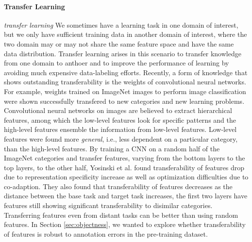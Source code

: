 \paragraph{Transfer Learning}
\textit{transfer learning}
We sometimes have a learning task in one domain of interest, but we only have sufficient training data in another domain of interest, where the two domain may or may not share the same feature space and have the same data distribution.
Transfer learning arises in this scenario to transfer knowledge from one domain to anthoer and to improve the performance of learning by avoiding much expensive data-labeling efforts.\cite{pan2010survey}
Recently, a form of knowledge that shows outstanding transferability is the weights of convolutional neural networks.
For example, weights trained on ImageNet images to perform image classification were shown successfully transfered to new categories and new learning problems\cite{girshick2014rich,long2015fully,shin2016deep}.
Convolutional neural networks on images are believed to extract hierarchical features, among which the low-level features look for specific patterns and the high-level features ensemble the information from low-level features.
Low-level features were found more \textit{general}, i.e., less dependent on a particular category, than the high-level features.
By training a CNN on a random half of the ImageNet categories and transfer features, varying from the bottom layers to the top layers, to the other half, Yosinski et al. found transferability of features drop due to representation specificity increase as well as optimization difficulties due to co-adaption.\cite{yosinski2014transferable}
They also found that transferability of features decreases as the distance between the base task and target task increases, the first two layers have features still showing significant transferability to disimilar categories.
Transferring features even from distant tasks can be better than using random features.
In Section \ref{sec:objectness}, we wanted to explore whether transferability of features is robust to annotation errors in the pre-training dataset.


